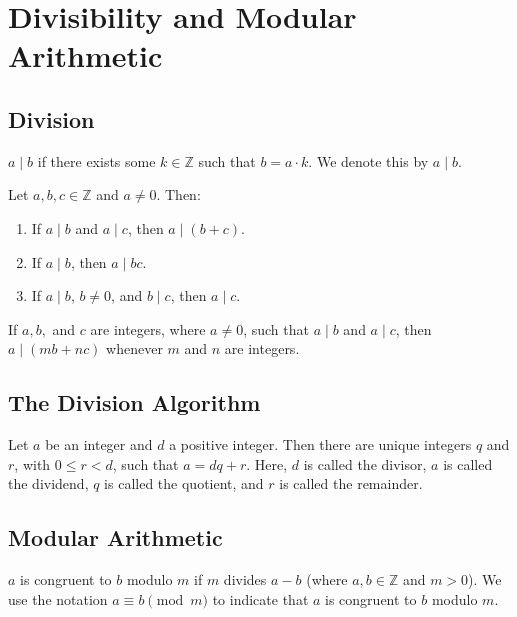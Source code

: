\documentclass{article}
\begin{document}
\section{Divisibility and Modular Arithmetic}
\subsection{Division}
\begin{principle}
    \( a \mid b \) if there exists some \( k \in \mathbb{Z} \) such that \( b = a \cdot k \). 
    We denote this by \( a \mid b \).
\end{principle}

\begin{theorem}
    Let \( a, b, c \in \mathbb{Z} \) and \( a \neq 0 \). Then:
    \begin{enumerate}
        \item If \( a \mid b \) and \( a \mid c \), then \( a \mid (b + c) \).
        \item If \( a \mid b \), then \( a \mid bc \).
        \item If \( a \mid b \), \( b \neq 0 \), and \( b \mid c \), then \( a \mid c \).
    \end{enumerate}
\end{theorem}

\begin{proposition}
    If \( a, b, \) and \( c \) are integers, where \( a \neq 0 \), such that \( a \mid b \) and \( a \mid c \), then \( a \mid (mb + nc) \) whenever \( m \) and \( n \) are integers.
\end{proposition}

\subsection{The Division Algorithm}
\begin{theorem}
    Let \( a \) be an integer and \( d \) a positive integer. Then there are unique integers \( q \) and \( r \), with \( 0 \leq r < d \), such that \( a = dq + r \).
    Here, \( d \) is called the divisor, \( a \) is called the dividend, \( q \) is called the quotient, and \( r \) is called the remainder.
\end{theorem}

\subsection{Modular Arithmetic}
\begin{definition}
    \( a \) is congruent to \( b \) modulo \( m \) if \( m \) divides \( a - b \) (where \( a, b \in \mathbb{Z} \) and \( m > 0 \)).
    We use the notation \( a \equiv b \pmod{m} \) to indicate that \( a \) is congruent to \( b \) modulo \( m \).
\end{definition}
\end{document}
